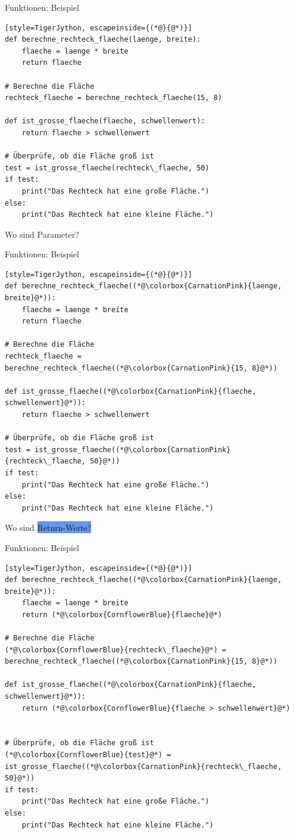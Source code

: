 \begin{frame}[fragile]{Funktionen: Beispiel}
\begin{lstlisting}[style=TigerJython, escapeinside={(*@}{@*)}]
def berechne_rechteck_flaeche(laenge, breite):
    flaeche = laenge * breite
    return flaeche
    
# Berechne die Fläche
rechteck_flaeche = berechne_rechteck_flaeche(15, 8)

def ist_grosse_flaeche(flaeche, schwellenwert):
    return flaeche > schwellenwert

# Überprüfe, ob die Fläche groß ist
test = ist_grosse_flaeche(rechteck\_flaeche, 50)
if test:
    print("Das Rechteck hat eine große Fläche.")
else:
    print("Das Rechteck hat eine kleine Fläche.")
\end{lstlisting}
Wo sind \colorbox{CarnationPink}{Parameter?}
\end{frame}

\begin{frame}[fragile]{Funktionen: Beispiel}
\begin{lstlisting}[style=TigerJython, escapeinside={(*@}{@*)}]
def berechne_rechteck_flaeche((*@\colorbox{CarnationPink}{laenge, breite}@*)):
    flaeche = laenge * breite
    return flaeche

# Berechne die Fläche
rechteck_flaeche = berechne_rechteck_flaeche((*@\colorbox{CarnationPink}{15, 8}@*))

def ist_grosse_flaeche((*@\colorbox{CarnationPink}{flaeche, schwellenwert}@*)):
    return flaeche > schwellenwert

# Überprüfe, ob die Fläche groß ist
test = ist_grosse_flaeche((*@\colorbox{CarnationPink}{rechteck\_flaeche, 50}@*))
if test:
    print("Das Rechteck hat eine große Fläche.")
else:
    print("Das Rechteck hat eine kleine Fläche.")
\end{lstlisting}
Wo sind \colorbox{CornflowerBlue}{Return-Werte?}
\end{frame}

\begin{frame}[fragile]{Funktionen: Beispiel}
\begin{lstlisting}[style=TigerJython, escapeinside={(*@}{@*)}]
def berechne_rechteck_flaeche((*@\colorbox{CarnationPink}{laenge, breite}@*)):
    flaeche = laenge * breite
    return (*@\colorbox{CornflowerBlue}{flaeche}@*)

# Berechne die Fläche
(*@\colorbox{CornflowerBlue}{rechteck\_flaeche}@*) = berechne_rechteck_flaeche((*@\colorbox{CarnationPink}{15, 8}@*))

def ist_grosse_flaeche((*@\colorbox{CarnationPink}{flaeche, schwellenwert}@*)):
    return (*@\colorbox{CornflowerBlue}{flaeche > schwellenwert}@*)


# Überprüfe, ob die Fläche groß ist
(*@\colorbox{CornflowerBlue}{test}@*) = ist_grosse_flaeche((*@\colorbox{CarnationPink}{rechteck\_flaeche, 50}@*))
if test:
    print("Das Rechteck hat eine große Fläche.")
else:
    print("Das Rechteck hat eine kleine Fläche.")
\end{lstlisting}
\end{frame}

